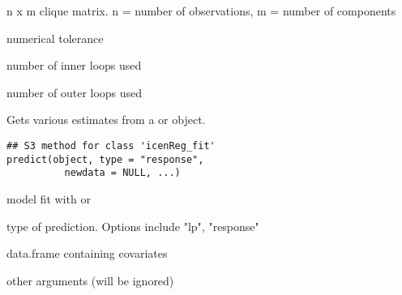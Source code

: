 \documentclass[a4paper]{book}
\begin{document}
%
\begin{Arguments}
\begin{ldescription}
\item[\code{cliqMat}] n x m clique matrix. n = number of observations, m = number of components
\item[\code{tol}] numerical tolerance
\item[\code{inner\_loops}] number of inner loops used
\item[\code{outer\_loops}] number of outer loops used
\end{ldescription}
\end{Arguments}
%
\begin{Examples}
\end{Examples}
%
\begin{Description}\relax
 
Gets various estimates from a  or  object. 

\end{Description}
%
\begin{Usage}
\begin{verbatim}
## S3 method for class 'icenReg_fit'
predict(object, type = "response", 
          newdata = NULL, ...) 
\end{verbatim}
\end{Usage}
%
\begin{Arguments}
\begin{ldescription}
\item[\code{object}] model fit with  or 
\item[\code{type}] type of prediction. Options include "lp", "response"
\item[\code{newdata}] data.frame containing covariates
\item[\code{...}] other arguments (will be ignored)
\end{ldescription}
\end{Arguments}
\end{document}
